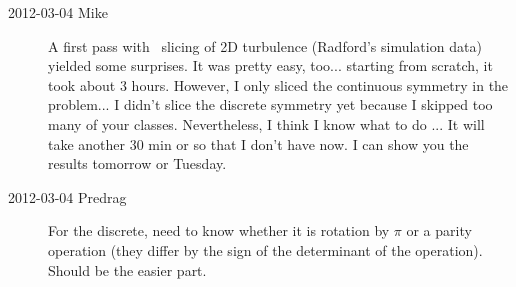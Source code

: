 \begin{description}
\item[2012-03-04 Mike]
A first pass with \statesp\ slicing of 2D turbulence (Radford's
simulation data) yielded some surprises.  It was pretty easy, too...
starting from scratch, it took about 3 hours. However, I only sliced the
continuous symmetry in the problem... I didn't slice the discrete
symmetry yet because I skipped too many of your classes. Nevertheless,
I think I know what to do ... It will take another 30 min or so that I
don't have now.  I can show you the results tomorrow or Tuesday.

\item[2012-03-04 Predrag] For the discrete, need to know whether it is
rotation by $\pi$ or a parity operation (they differ by the sign of the
determinant of the operation). Should be the easier part.

\end{description}
